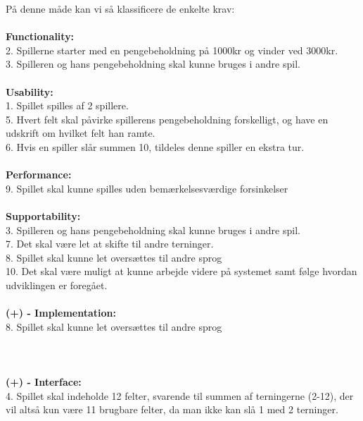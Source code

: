 På denne måde kan vi så klassificere de enkelte krav:
\\\\\textbf{Functionality:}
\\ 2. Spillerne starter med en pengebeholdning på 1000kr og vinder ved 3000kr.
\\ 3. Spilleren og hans pengebeholdning skal kunne bruges i andre spil.
\\\\\textbf{Usability:}
\\1. Spillet spilles af 2 spillere.
\\ 5. Hvert felt skal påvirke spillerens pengebeholdning forskelligt, og have en udskrift om hvilket felt han ramte.
\\ 6. Hvis en spiller slår summen 10, tildeles denne spiller en ekstra tur.
\\\\\textbf{Performance:}
\\9. Spillet skal kunne spilles uden bemærkelsesværdige forsinkelser
\\\\\textbf{Supportability:}
\\ 3. Spilleren og hans pengebeholdning skal kunne bruges i andre spil.
\\ 7. Det skal være let at skifte til andre terninger.
\\ 8. Spillet skal kunne let oversættes til andre sprog
\\ 10. Det skal være muligt at kunne arbejde videre på systemet samt følge hvordan udviklingen er foregået.
\\\\\textbf{(+) - Implementation:}
\\ 8. Spillet skal kunne let oversættes til andre sprog
\\\\\\\\\textbf{(+) - Interface:}
\\ 4. Spillet skal indeholde 12 felter, svarende til summen af terningerne (2-12), der vil altså kun være 11 brugbare felter, da man ikke kan slå 1 med 2 terninger.

